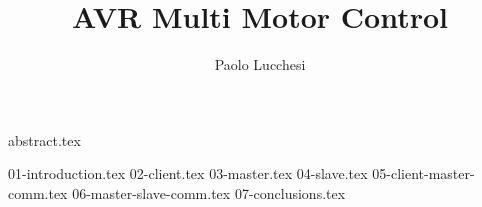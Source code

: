 \documentclass[binding=0.6cm,Lau]{sapthesis}
\title{AVR Multi Motor Control}
\author{Paolo Lucchesi}
\begin{document}
\frontmatter
\maketitle

\dedication{
Dedicated to my family, my granddad Pietro, my mom Anna Rosa, my dad Marco,
my grandmom Pierina and my sister Valentina, which I thank everyday for
everything I am.\\
To my dearest friends in Pitigliano, with whom I share some of the most
beautiful memories I have.\\
To Nicola, with whom I have shared part of this path; he helped me in a
dark period of my life and he is one of my dearest friends.
}

{abstract.tex}

\tableofcontents
{
  \listoftables
  \let\cleardoublepage\clearpage
  \listoffigures
}

\mainmatter
{01-introduction.tex}
{02-client.tex}
{03-master.tex}
{04-slave.tex}
{05-client-master-comm.tex}
{06-master-slave-comm.tex}
{07-conclusions.tex}

\backmatter
\cleardoublepage
{} %



\end{document}
